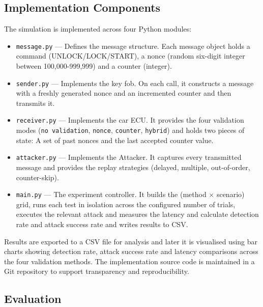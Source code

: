 \documentclass[a4paper,man,12pt]{article}
\begin{document}
\subsection{Implementation Components}

The simulation is implemented across four Python modules:

\begin{itemize}
    \item \texttt{message.py} — Defines the message structure. Each message
    object holds a command (UNLOCK/LOCK/START), a nonce (random six-digit
    integer between 100,000-999,999) and a counter (integer). 

    
    \item \texttt{sender.py} — Implements the key fob. On each call, it
    constructs a message with a freshly generated nonce and an incremented
    counter and then transmits it. 


    \item \texttt{receiver.py} — Implements the car ECU. It provides the four
    validation modes (\texttt{no validation}, \texttt{nonce}, \texttt{counter},
    \texttt{hybrid}) and holds two pieces of state: A set of past nonces and
    the last accepted counter value. 
    
    \item \texttt{attacker.py} — Implements the Attacker. It captures every
    transmitted message and provides the replay strategies (delayed, multiple, out-of-order,
    counter-skip).

    \item \texttt{main.py} — The experiment controller. It builds the
    (method $\times$ scenario) grid, runs each test in isolation across the
    configured number of trials, executes the relevant attack and measures the latency and
    calculate detection rate and attack success rate and writes results to CSV.
    
\end{itemize}

Results are exported to a CSV file for analysis and later it is visualised using bar charts showing detection rate, attack success rate and latency comparisons across the four validation methods. The implementation source code is maintained in a Git repository to support transparency and reproducibility.

\pagebreak

\subsection{Evaluation}
\label{Sec:Evaluation}
\end{document}
